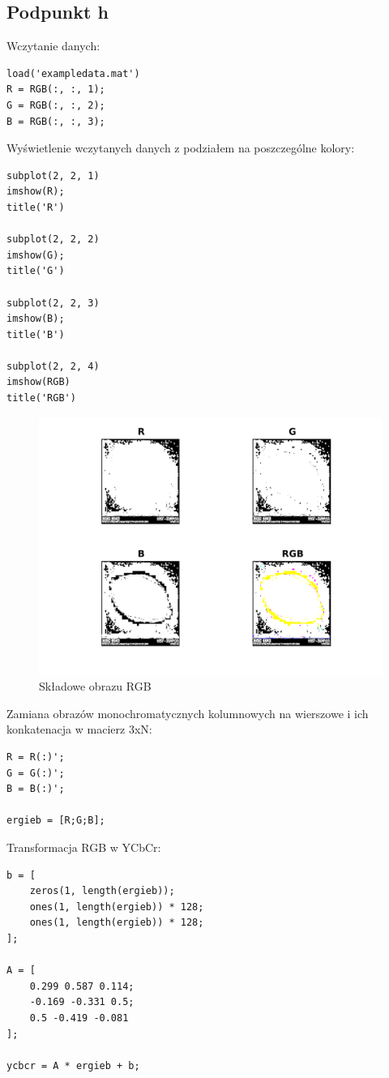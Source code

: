 \documentclass[a4paper, 12pt, titlepage]{article}
\begin{document}
        \subsection{Podpunkt h}
            Wczytanie danych:
\begin{lstlisting}
load('exampledata.mat')
R = RGB(:, :, 1);
G = RGB(:, :, 2);
B = RGB(:, :, 3);
\end{lstlisting}
            Wyświetlenie wczytanych danych z podziałem na poszczególne kolory:
\begin{lstlisting}
subplot(2, 2, 1)
imshow(R);
title('R')

subplot(2, 2, 2)
imshow(G);
title('G')

subplot(2, 2, 3)
imshow(B);
title('B')

subplot(2, 2, 4)
imshow(RGB)
title('RGB')
\end{lstlisting}
        \begin{figure}[H] \centering
            \includegraphics[width=0.8\columnwidth]{RGV.png}
            \caption{Składowe obrazu RGB}
        \end{figure}\noindent
        Zamiana obrazów monochromatycznych kolumnowych na wierszowe i 
        ich konkatenacja w macierz 3xN:
\begin{lstlisting}
R = R(:)';
G = G(:)';
B = B(:)';

ergieb = [R;G;B];
\end{lstlisting}
        Transformacja RGB w YCbCr:
\begin{lstlisting}
b = [
    zeros(1, length(ergieb));
    ones(1, length(ergieb)) * 128;
    ones(1, length(ergieb)) * 128;
];

A = [
    0.299 0.587 0.114;
    -0.169 -0.331 0.5;
    0.5 -0.419 -0.081
];

ycbcr = A * ergieb + b;
\end{lstlisting}
\end{document}
